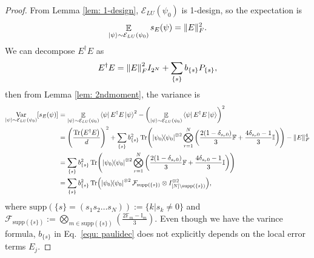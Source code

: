 \documentclass[showpacs,amsmath,amssymb,twocolumn,aps,pra,superscriptaddress,notitlepage,10pt]{revtex4-2}
\newcommand{\bE}{\mathbb E}
\newcommand{\cE}{\mathcal E_{LU}}
\newcommand{\supp}{\mathrm{supp}}
\begin{document}
\begin{proof}
    From Lemma \ref{lem: 1-design}, $\cE(\psi_0)$ is 1-design, so the expectation is \cite{zhao_hamiltonian_2022}
    \begin{equation}
        \mathop{\bE}_{\ket{\psi}\sim\cE(\psi_0)} s_E(\psi)=\|E\|_F^2.
    \end{equation}
    We can decompose $E^\dagger E$ as
    \begin{equation}
        E^\dagger E=\norm{E}_F^2I_{2^N}+\sum_{\{s\}}b_{\{s\}}P_{\{s\}},\label{equ: paulidec}
    \end{equation}
    then from Lemma \ref{lem: 2ndmoment}, the variance is
    \begin{align}
         \mathop{\mathrm{Var}}_{\ket{\psi}\sim\cE(\psi_0)}[s_E(\psi)] &= \mathop {\bE}_{\ket{\psi}\sim\cE(\psi_0)} \bra{\psi}E^\dagger E\ket{\psi}^2-\left(\mathop {\bE}_{\ket{\psi}\sim\cE(\psi_0)} \bra{\psi}E^\dagger E\ket{\psi}\right)^2\notag\\
         &=\left(\frac{\Tr(E^\dagger E)}{d}\right)^2+\sum_{\{s\}}b_{\{s\}}^2\Tr(\ketbra{\psi_0}{\psi_0}^{\otimes 2}\bigotimes_{r=1}^{N}\left(\frac{2(1-\delta_{s_r0})}{3}\mathbb F+\frac{4\delta_{s_r0}-1}{3}\mathbb I\right))-\|E\|_F^4\notag\\ &=\sum_{\{s\}}b_{\{s\}}^2\Tr(\ketbra{\psi_0}{\psi_0}^{\otimes 2}\bigotimes_{r=1}^{N}\left(\frac{2(1-\delta_{s_r0})}{3}\mathbb F+\frac{4\delta_{s_r0}-1}{3}\mathbb I\right))\notag\\
         &=\sum_{\{s\}}b_{\{s\}}^2\Tr(\ketbra{\psi_0}{\psi_0}^{\otimes 2}\mathcal F_{\supp(\{s\})}\otimes I_{[N]\setminus\supp(\{s\})}^{\otimes 2}),\label{equ: varresult}
    \end{align}
    where $\supp(\{s\}=(s_1s_2\dots s_N)):=\{k|s_k\ne0\}$ and $\mathcal F_{\supp(\{s\})}:=\bigotimes_{m\in\supp(\{s\})}\left(\frac{2\mathbb F_{m}-\mathbb I_{m}}{3}\right)$. Even though we have the varince formula,
    $b_{\{s\}}$ in Eq.~\eqref{equ: paulidec} does not explicitly depends on the local error terms $E_j$.


\end{proof}
\end{document}
